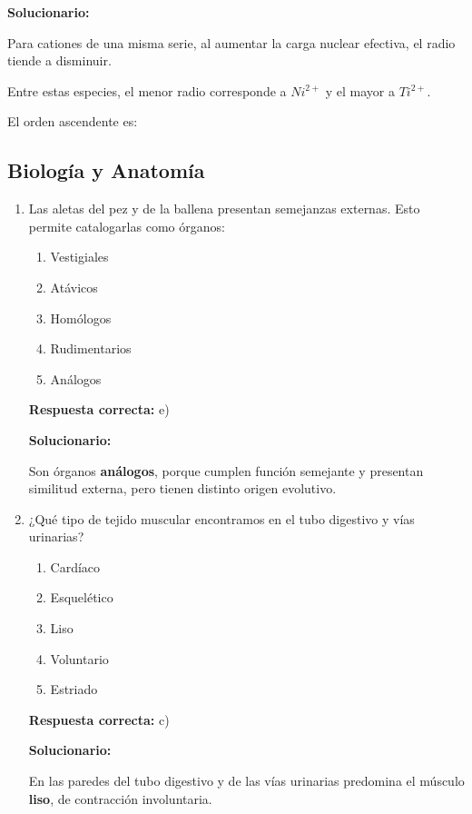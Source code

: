 \begin{enumerate}[resume]
	\vspace{2mm}
	\textbf{Solucionario:}
	
	Para cationes de una misma serie, al aumentar la carga nuclear efectiva, el radio tiende a disminuir.
	
	Entre estas especies, el menor radio corresponde a $Ni^{2+}$ y el mayor a $Ti^{2+}$.
	
	El orden ascendente es:
	
	
	
	\vspace{6mm}
\end{enumerate}

\subsection*{Biología y Anatomía}

\begin{enumerate}[resume]

	
	\item Las aletas del pez y de la ballena presentan semejanzas externas. Esto permite catalogarlas como órganos:
	\begin{enumerate}[label=\alph*)]
		\item Vestigiales
		\item Atávicos
		\item Homólogos
		\item Rudimentarios
		\item Análogos
	\end{enumerate}
	\textbf{Respuesta correcta:} e)
	
	\vspace{2mm}
	\textbf{Solucionario:}
	
	Son órganos \textbf{análogos}, porque cumplen función semejante y presentan similitud externa, pero tienen distinto origen evolutivo.
	

	
	\vspace{6mm}
	
	\item ¿Qué tipo de tejido muscular encontramos en el tubo digestivo y vías urinarias?
	\begin{enumerate}[label=\alph*)]
		\item Cardíaco
		\item Esquelético
		\item Liso
		\item Voluntario
		\item Estriado
	\end{enumerate}
	\textbf{Respuesta correcta:} c)
	
	\vspace{2mm}
	\textbf{Solucionario:}
	
	En las paredes del tubo digestivo y de las vías urinarias predomina el músculo \textbf{liso}, de contracción involuntaria.
	

	\vspace{6mm}
\end{enumerate}

